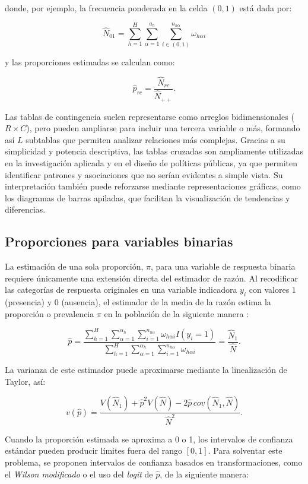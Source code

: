 \documentclass[
  spanish,
  12pt,
]{book}
\begin{document}
donde, por ejemplo, la frecuencia ponderada en la celda \((0,1)\) está dada por:

\[
\hat{N}_{01} = \sum_{h=1}^{H} \sum_{\alpha=1}^{a_{h}} \sum_{i \in (0,1)}^{n_{h\alpha}} \omega_{h\alpha i}
\]

y las proporciones estimadas se calculan como:

\[
\hat{p}_{rc}=\frac{\hat{N}_{rc}}{\hat{N}_{++}}.
\]

Las tablas de contingencia suelen representarse como arreglos bidimensionales (\(R \times C\)), pero pueden ampliarse para incluir una tercera variable o más, formando así \(L\) subtablas que permiten analizar relaciones más complejas. Gracias a su simplicidad y potencia descriptiva, las tablas cruzadas son ampliamente utilizadas en la investigación aplicada y en el diseño de políticas públicas, ya que permiten identificar patrones y asociaciones que no serían evidentes a simple vista. Su interpretación también puede reforzarse mediante representaciones gráficas, como los diagramas de barras apiladas, que facilitan la visualización de tendencias y diferencias.

\subsection{Proporciones para variables binarias}\label{proporciones-para-variables-binarias}

La estimación de una sola proporción, \(\pi\), para una variable de respuesta binaria requiere únicamente una extensión directa del estimador de razón. Al recodificar las categorías de respuesta originales en una variable indicadora \(y_{i}\) con valores \(1\) (presencia) y \(0\) (ausencia), el estimador de la media de la razón estima la proporción o prevalencia \(\pi\) en la población de la siguiente manera \citep{heeringa2017applied}:

\[
\hat{p} = \frac{\sum_{h=1}^{H}\sum_{\alpha=1}^{\alpha_{h}}\sum_{i=1}^{n_{h\alpha}} \omega_{h\alpha i}I(y_{i}=1)}{\sum_{h=1}^{H}\sum_{\alpha=1}^{\alpha_{h}}\sum_{i=1}^{n_{h\alpha}} \omega_{h\alpha i}}
= \frac{\hat{N}_{1}}{\hat{N}}.
\]

La varianza de este estimador puede aproximarse mediante la linealización de Taylor, así:

\[
v(\hat{p}) \dot{=} \frac{V(\hat{N}_{1})+\hat{p}^{2}V(\hat{N})-2\hat{p}\,cov(\hat{N}_{1},\hat{N})}{\hat{N}^{2}}.
\]

Cuando la proporción estimada se aproxima a 0 o 1, los intervalos de confianza estándar pueden producir límites fuera del rango \([0,1]\). Para solventar este problema, se proponen intervalos de confianza basados en transformaciones, como el \emph{Wilson modificado} o el uso del \emph{logit} de \(\hat{p}\), de la siguiente manera:
\end{document}
